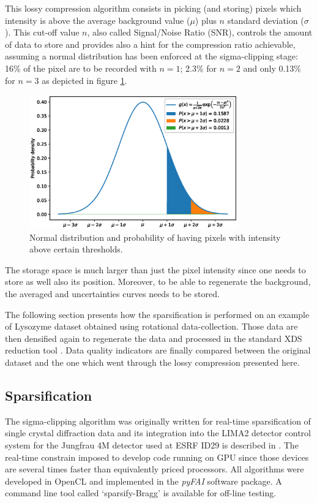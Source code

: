 \documentclass[preprint]{iucr}              %
\begin{document}
This lossy compression algorithm consists in picking (and storing) pixels which intensity is above the average background value ($\mu$) plus $n$ standard deviation ($\sigma$). 
This cut-off value $n$, also called Signal/Noise Ratio (SNR), controls the amount of data to store and provides also a hint for the compression ratio achievable, assuming a normal distribution has been enforced at the sigma-clipping stage: 16\% of the pixel are to be recorded with $n=1$;  2.3\% for $n=2$ and only 0.13\% for $n=3$ as depicted in figure \ref{distribution}.
\begin{figure}
\label{distribution}
\begin{center}
\includegraphics[width=9cm]{distribution}
\caption{Normal distribution and probability of having pixels with intensity above certain thresholds.}
\end{center}
\end{figure}

The storage space is much larger than just the pixel intensity since one needs to store as well also its position. 
Moreover, to be able to regenerate the background, the averaged and uncertainties curves needs to be stored.

The following section presents how the sparsification is performed on an example of Lysozyme dataset obtained using rotational data-collection.
Those data are then densified again to regenerate the data and processed in the standard XDS reduction tool \cite{xds}.
Data quality indicators are finally compared between the original dataset and the one which went through the lossy compression presented here.

\subsection{Sparsification}

The sigma-clipping algorithm was originally written for real-time sparsification of single crystal diffraction data and its integration into the LIMA2 \cite{lima} detector control system for the Jungfrau 4M detector used at ESRF ID29 is described in \cite{sri2021}.
The real-time constrain imposed to develop code running on GPU since those devices are several times
faster than equivalently priced processors.
All algorithms were developed in OpenCL \cite{opencl_khronos} and implemented in the \textit{pyFAI} software package.
A command line tool called `sparsify-Bragg' is available for off-line testing.
\end{document}
